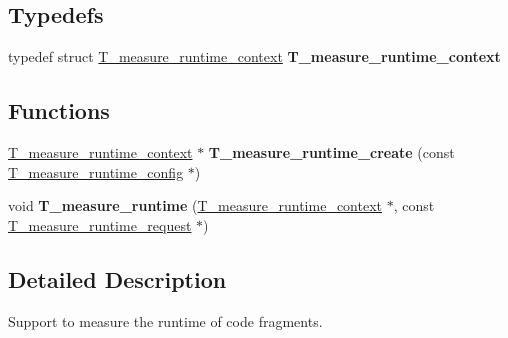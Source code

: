 \subsection*{Typedefs}
\begin{DoxyCompactItemize}
\item 
\mbox{\label{group__RTEMSTestFrameworkMeasureRuntime_ga7c6095a22226d63ed768cd650132e65b}} 
typedef struct \mbox{\hyperlink{structT__measure__runtime__context}{T\+\_\+measure\+\_\+runtime\+\_\+context}} {\bfseries T\+\_\+measure\+\_\+runtime\+\_\+context}
\end{DoxyCompactItemize}
\subsection*{Functions}
\begin{DoxyCompactItemize}
\item 
\mbox{\label{group__RTEMSTestFrameworkMeasureRuntime_gac335a690b5d3442655772745f0469817}} 
\mbox{\hyperlink{structT__measure__runtime__context}{T\+\_\+measure\+\_\+runtime\+\_\+context}} $\ast$ {\bfseries T\+\_\+measure\+\_\+runtime\+\_\+create} (const \mbox{\hyperlink{structT__measure__runtime__config}{T\+\_\+measure\+\_\+runtime\+\_\+config}} $\ast$)
\item 
\mbox{\label{group__RTEMSTestFrameworkMeasureRuntime_ga2fa23bb7aac6a1b354ad3eb3d31c467d}} 
void {\bfseries T\+\_\+measure\+\_\+runtime} (\mbox{\hyperlink{structT__measure__runtime__context}{T\+\_\+measure\+\_\+runtime\+\_\+context}} $\ast$, const \mbox{\hyperlink{structT__measure__runtime__request}{T\+\_\+measure\+\_\+runtime\+\_\+request}} $\ast$)
\end{DoxyCompactItemize}


\subsection{Detailed Description}
Support to measure the runtime of code fragments. 

